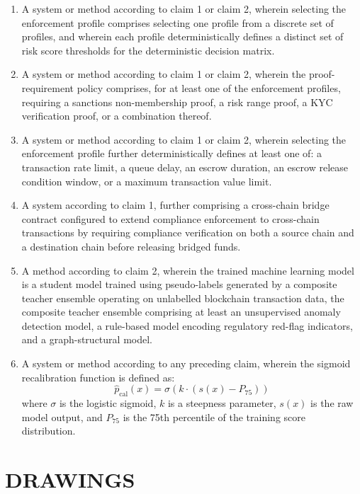 \documentclass[12pt,a4paper]{article}
\begin{document}
\begin{enumerate}[label=\textbf{\arabic*.}]
\item A system or method according to claim 1 or claim 2, wherein selecting 
the enforcement profile comprises selecting one profile from a discrete set 
of profiles, and wherein each profile deterministically defines a distinct 
set of risk score thresholds for the deterministic decision matrix.

\item A system or method according to claim 1 or claim 2, wherein the proof-
requirement policy comprises, for at least one of the enforcement profiles, 
requiring a sanctions non-membership proof, a risk range proof, a KYC 
verification proof, or a combination thereof.

\item A system or method according to claim 1 or claim 2, wherein selecting 
the enforcement profile further deterministically defines at least one of: a 
transaction rate limit, a queue delay, an escrow duration, an escrow release 
condition window, or a maximum transaction value limit.

\item A system according to claim 1, further comprising a cross-chain bridge 
contract configured to extend compliance enforcement to cross-chain 
transactions by requiring compliance verification on both a source chain and 
a destination chain before releasing bridged funds.

\item A method according to claim 2, wherein the trained machine learning 
model is a student model trained using pseudo-labels generated by a 
composite teacher ensemble operating on unlabelled blockchain transaction 
data, the composite teacher ensemble comprising at least an unsupervised 
anomaly detection model, a rule-based model encoding regulatory red-flag 
indicators, and a graph-structural model.

\item A system or method according to any preceding claim, wherein the 
sigmoid recalibration function is defined as:
\[
\hat{p}_{\text{cal}}(x) = \sigma\left(k \cdot (s(x) - P_{75})\right)
\]
where $\sigma$ is the logistic sigmoid, $k$ is a steepness parameter, $s(x)$ 
is the raw model output, and $P_{75}$ is the 75th percentile of the training 
score distribution.

\end{enumerate}

\section{DRAWINGS}
\end{document}
